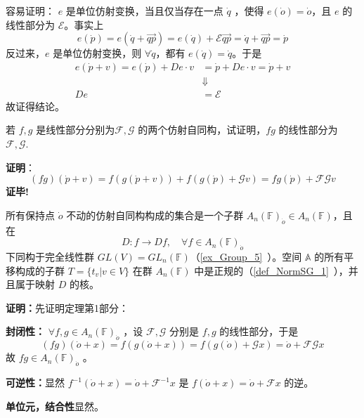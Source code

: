 容易证明： $e$ 是单位仿射变换，当且仅当存在一点 $\dot q$ ，使得 $e(\dot o)=\dot o$，且 $e$ 的线性部分为 $\mathcal E$。事实上
 \begin{equation}
  e(\dot p)=e(\dot q+\overrightarrow{qp})=e(\dot q)+\mathcal E \overrightarrow{qp}=\dot q+\overrightarrow{qp}=\dot p
 \end{equation}
反过来，$e$ 是单位仿射变换，则 $\forall\dot q$，都有 $e(\dot q)=\dot q$。于是
\begin{equation}
\begin{aligned}
e(\dot p+v)=e(\dot p)+De\cdot v&=\dot p+De\cdot v=\dot p+v\\
&\Downarrow\\
De&=\mathcal E
\end{aligned}
\end{equation}
故证得结论。
\begin{example}{}
若 $f,g$ 是线性部分分别为$\mathcal F,\mathcal G$ 的两个仿射自同构，试证明，$fg$ 的线性部分为 $\mathcal {F,G}$.

\textbf{证明}：\begin{equation}
(fg)(\dot p+v)=f(g(\dot p+v))+f(g(\dot p)+\mathcal G v)=fg(\dot p)+\mathcal {FG}v
\end{equation}
\textbf{证毕!}
\end{example}
\begin{theorem}{}
所有保持点 $\dot o$ 不动的仿射自同构构成的集合是一个子群 $A_n(\mathbb F)_{\dot o}\in A_n(\mathbb F)$，且在 
\begin{equation}
D:f\rightarrow Df,\quad \forall f\in A_n(\mathbb F)_{\dot o}
\end{equation}
下同构于完全线性群 $GL(V)=GL_n(\mathbb F)$（\autoref{ex_Group_5}~）。空间 $\mathbb A$ 的所有平移构成的子群 $T=\{t_v|v\in V\}$ 在群 $A_n(\mathbb F)$ 中是正规的（\autoref{def_NormSG_1}~），并且属于映射 $D$ 的核。
\end{theorem}
\textbf{证明：}先证明定理第1部分：

\textbf{封闭性：} $\forall f,g\in A_n(\mathbb F)_{\dot o}$ ，设 $\mathcal F,\mathcal G$ 分别是 $f,g$ 的线性部分，于是 
\begin{equation}
(fg)(\dot o+x)=f(g(\dot o+x))=f(g(\dot o)+\mathcal G x)=\dot o+\mathcal{FG}x
\end{equation}
故 $fg\in A_n(\mathbb F)_{\dot o}$ 。

\textbf{可逆性：}显然 $f^{-1}(\dot o+x)=\dot o+\mathcal F^{-1}x$ 是 $f(\dot o+x)=\dot o+\mathcal F x$ 的逆。

\textbf{单位元，结合性}显然。

